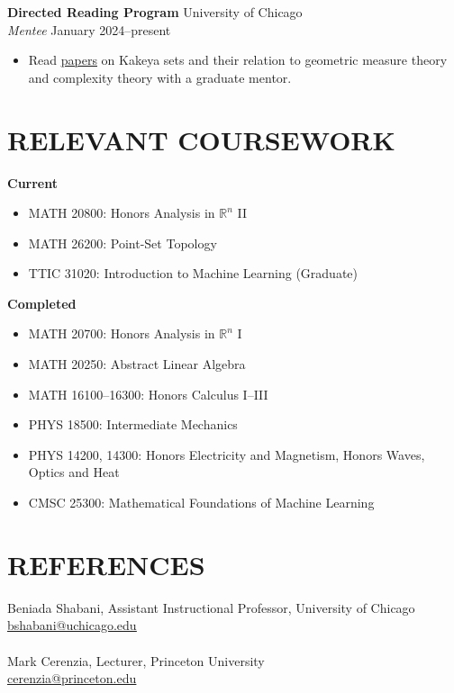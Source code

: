 \documentclass[a4paper, 11pt]{extarticle}
\begin{document}
\noindent
\textbf{Directed Reading Program} \hfill University of Chicago \\
\textit{Mentee} \hfill January 2024--present
\begin{itemize}
    \item Read \href{https://arxiv.org/pdf/1511.00442.pdf}{\underline{papers}} on Kakeya sets and their relation to geometric measure theory and complexity theory with a graduate mentor.
\end{itemize}

\section*{RELEVANT COURSEWORK}
\textbf{Current}
\begin{itemize}
    \item MATH 20800: Honors Analysis in $\mathbb{R}^n$ II
    \item MATH 26200: Point-Set Topology
    \item TTIC 31020: Introduction to Machine Learning (Graduate)
\end{itemize}
\textbf{Completed}
\begin{itemize}
    \item MATH 20700: Honors Analysis in $\mathbb{R}^n$ I
    \item MATH 20250: Abstract Linear Algebra
    \item MATH 16100--16300: Honors Calculus I--III
    \item PHYS 18500: Intermediate Mechanics
    \item PHYS 14200, 14300: Honors Electricity and Magnetism, Honors Waves, Optics and Heat
    \item CMSC 25300: Mathematical Foundations of Machine Learning
\end{itemize}

\section*{REFERENCES}
Beniada Shabani, Assistant Instructional Professor, University of Chicago\\
\href{mailto:bshabani@uchicago.edu}{\underline{bshabani@uchicago.edu}}\\
\\
Mark Cerenzia, Lecturer, Princeton University\\
\href{mailto:cerenzia@princeton.edu}{\underline{cerenzia@princeton.edu}}
\end{document}
